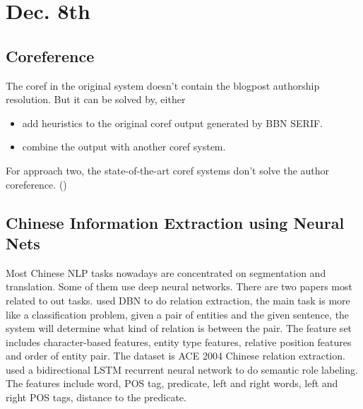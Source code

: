\documentclass[a4paper, 12pt]{article}
\begin{document}
\section{Dec. 8th}
  \subsection{Coreference}
   The coref in the original system doesn't contain the blogpost authorship
   resolution. But it can be solved by, either
   \begin{itemize}
       \item add heuristics to the original coref output generated by BBN SERIF.
       \item combine the output with another coref system.
   \end{itemize}
   For approach two, the state-of-the-art coref systems don't solve the author
   coreference. (\cite{danrothconstrained, lee2011stanford, durrett2013easy})
  \subsection{Chinese Information Extraction using Neural Nets}
  Most Chinese NLP tasks nowadays are concentrated on segmentation and
  translation. Some of them use deep neural networks. There are two papers most
  related to out tasks. \cite{chen2010exploring} used DBN to do relation
  extraction, the main task is more like a classification problem, given a pair
  of entities and the given sentence, the system will determine what kind of
  relation is between the pair. The feature set includes character-based
  features, entity type features, relative position features and order of entity
  pair. The dataset is ACE 2004 Chinese relation extraction.\\ 
  \cite{wang2015chinese} used a bidirectional LSTM recurrent neural network to do
  semantic role labeling. The features include word, POS tag, predicate,
  left and right words, left and right POS tags, distance to the
  predicate.





\end{document}

